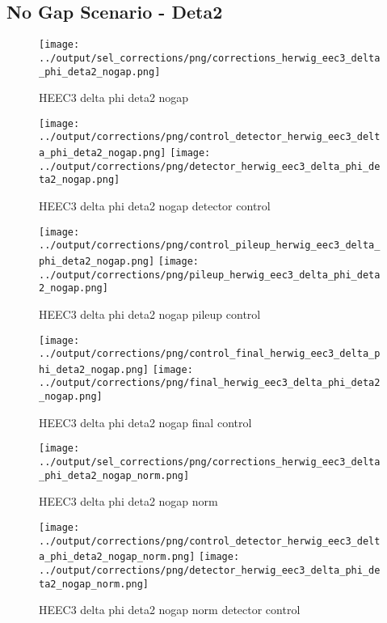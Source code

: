\documentclass[11pt]{book}
\begin{document}
\clearpage
\subsection{No Gap Scenario - Deta2}
\begin{figure}[ht]
\centering
\texttt{[image: ../output/sel\_corrections/png/corrections\_herwig\_eec3\_delta\_phi\_deta2\_nogap.png]}
\caption{HEEC3 delta phi deta2 nogap}
\label{fig:HEEC3_delta_phi_deta2_nogap}
\end{figure}

\begin{figure}[ht]
\centering
\texttt{[image: ../output/corrections/png/control\_detector\_herwig\_eec3\_delta\_phi\_deta2\_nogap.png]}
\texttt{[image: ../output/corrections/png/detector\_herwig\_eec3\_delta\_phi\_deta2\_nogap.png]}
\caption{HEEC3 delta phi deta2 nogap detector control}
\label{fig:HEEC3_delta_phi_deta2_nogap_detector_control}
\end{figure}

\begin{figure}[ht]
\centering
\texttt{[image: ../output/corrections/png/control\_pileup\_herwig\_eec3\_delta\_phi\_deta2\_nogap.png]}
\texttt{[image: ../output/corrections/png/pileup\_herwig\_eec3\_delta\_phi\_deta2\_nogap.png]}
\caption{HEEC3 delta phi deta2 nogap pileup control}
\label{fig:HEEC3_delta_phi_deta2_nogap_pileup_control}
\end{figure}


\begin{figure}[ht]
\centering
\texttt{[image: ../output/corrections/png/control\_final\_herwig\_eec3\_delta\_phi\_deta2\_nogap.png]}
\texttt{[image: ../output/corrections/png/final\_herwig\_eec3\_delta\_phi\_deta2\_nogap.png]}
\caption{HEEC3 delta phi deta2 nogap final control}
\label{fig:HEEC3_delta_phi_deta2_nogap_final_control}
\end{figure}




\begin{figure}[ht]
\centering
\texttt{[image: ../output/sel\_corrections/png/corrections\_herwig\_eec3\_delta\_phi\_deta2\_nogap\_norm.png]}
\caption{HEEC3 delta phi deta2 nogap norm}
\label{fig:HEEC3_delta_phi_deta2_nogap_norm}
\end{figure}


\begin{figure}[ht]
\centering
\texttt{[image: ../output/corrections/png/control\_detector\_herwig\_eec3\_delta\_phi\_deta2\_nogap\_norm.png]}
\texttt{[image: ../output/corrections/png/detector\_herwig\_eec3\_delta\_phi\_deta2\_nogap\_norm.png]}
\caption{HEEC3 delta phi deta2 nogap norm detector control}
\label{fig:HEEC3_delta_phi_deta2_nogap_norm_detector_control}
\end{figure}
\end{document}
